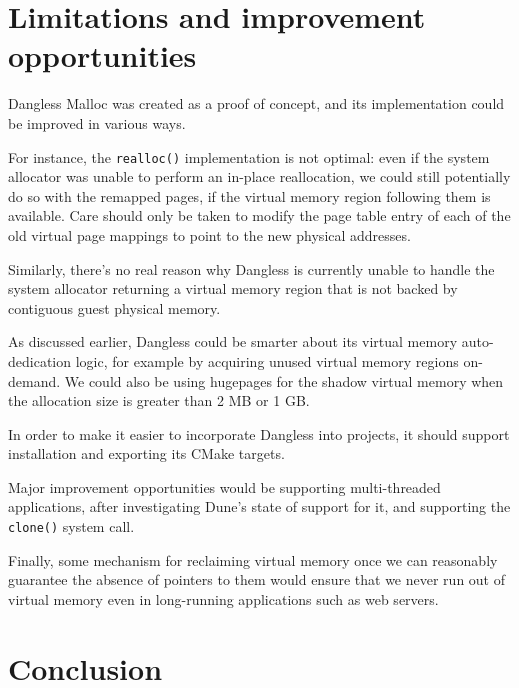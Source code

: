 
\section{Limitations and improvement opportunities}

Dangless Malloc was created as a proof of concept, and its implementation could be improved in various ways.

For instance, the \lstinline!realloc()! implementation is not optimal: even if the system allocator was unable to perform an in-place reallocation, we could still potentially do so with the remapped pages, if the virtual memory region following them is available. Care should only be taken to modify the page table entry of each of the old virtual page mappings to point to the new physical addresses.

Similarly, there's no real reason why Dangless is currently unable to handle the system allocator returning a virtual memory region that is not backed by contiguous guest physical memory.

As discussed earlier, Dangless could be smarter about its virtual memory auto-dedication logic, for example by acquiring unused virtual memory regions on-demand. We could also be using hugepages for the shadow virtual memory when the allocation size is greater than 2 MB or 1 GB.

In order to make it easier to incorporate Dangless into projects, it should support installation and exporting its CMake targets.

Major improvement opportunities would be supporting multi-threaded applications, after investigating Dune's state of support for it, and supporting the \lstinline!clone()! system call.

Finally, some mechanism for reclaiming virtual memory once we can reasonably guarantee the absence of pointers to them would ensure that we never run out of virtual memory even in long-running applications such as web servers.

\section{Conclusion}

